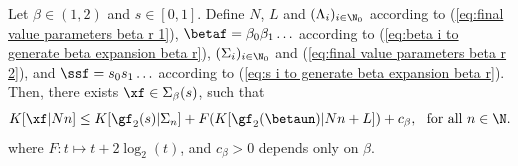 \begin{lemma}\label{lem:weak inequality binary beta expansion Kolmogorov rational beta r}
	Let $\beta \in (1,2)$ and $s \in [0,1]$. Define $N$, $L$ and $(\Lambda_i)_{i \in \N_0}$ according to (\ref{eq:final value parameters beta r 1}), $\betaf = \beta_0\beta_1\ldots$ according to (\ref{eq:beta i to generate beta expansion beta r}), $(\Sigma_i)_{i \in \N_0}$  and (\ref{eq:final value parameters beta r 2}),  and $\ssf = s_0s_1\ldots $ according to (\ref{eq:s i to generate beta expansion beta r}). Then, there exists $\xf \in \Sigma_\beta(s)$, such that
	\begin{equation}
		K[\xf|N n] \leq K[\gf_2(s)|\Sigma_n] +F(K[\gf_2(\betaun)|Nn+L])+ c_\beta, \ \ \text{for all} \ n \in \N.
	\end{equation}
	where $F : t \mapsto t + 2\log_2(t)$, and $c_\beta > 0$ depends only on $\beta$.
\end{lemma}
